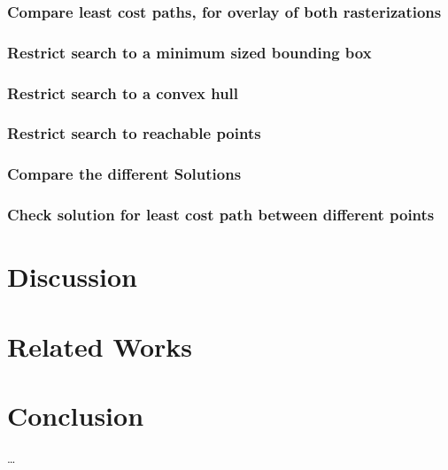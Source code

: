 \documentclass[acmtog]{acmart}
\begin{document}
	\subsubsection{Compare least cost paths, for overlay of both rasterizations}
	\subsubsection{Restrict search to a minimum sized bounding box}
	\subsubsection{Restrict search to a convex hull}
	\subsubsection{Restrict search to reachable points}

	\subsubsection{Compare the different Solutions}
	\subsubsection{Check solution for least cost path between different points}
	
	\section{Discussion}
	\section{Related Works}
	\section{Conclusion}


	

	





\begin{acks}
	\ldots
\end{acks}



\end{document}
